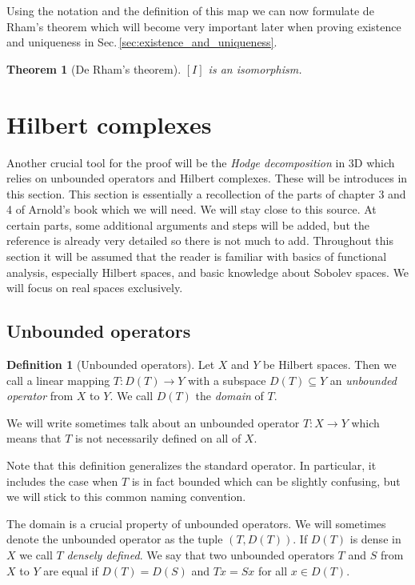 \documentclass[12pt,a4paper]{article}
\numberwithin{equation}{subsection}
\numberwithin{lemma}{subsection}
\newtheorem{theorem}[lemma]{Theorem}
\theoremstyle{definition}
\newtheorem{definition}[lemma]{Definition}
\begin{document}
Using the notation and the definition of this map we can now formulate 
de Rham's theorem which will become very important later when proving
existence and uniqueness in Sec.\,\ref{sec:existence_and_uniqueness}.
\begin{theorem}[De Rham's theorem]\label{thm:de_rhams_theorem}
    $[I]$ is an isomorphism.
\end{theorem}

\section{Hilbert complexes}

Another crucial tool for the proof will be the \textit{Hodge decomposition} 
in 3D which relies on unbounded operators and Hilbert complexes. These 
will be introduces in this section. This section is essentially a 
recollection of the parts of chapter 3 and 4 of Arnold's book \cite{arnold}
which we will need. We will stay close to this source. At certain parts, 
some additional arguments and steps will be added, but the reference is 
already very detailed so there is not much to add. Throughout this section 
it will be assumed that the reader is familiar with basics of functional analysis, 
especially Hilbert spaces, 
and basic knowledge about Sobolev spaces. We will focus on real spaces 
exclusively.

\subsection{Unbounded operators}\label{sec:unbounded_operators}

\begin{definition}[Unbounded operators]
    Let $X$ and $Y$ be Hilbert spaces. Then we call a linear mapping 
    $T: D(T) \rightarrow Y$ with a subspace $D(T) \subseteq Y$ an 
    \textit{unbounded 
    operator} from $X$ to $Y$. We call $D(T)$ the \textit{domain} of $T$.
\end{definition}
We will write sometimes talk about an unbounded operator $T:X \rightarrow Y$ 
which means that $T$ is not necessarily defined on all of $X$. 

Note that this definition generalizes the standard operator. In particular, 
it includes the case when $T$ is in fact bounded which can be 
slightly confusing, but we will stick to this common naming convention. 

The domain is a crucial property of unbounded operators. We will sometimes 
denote the unbounded operator as the tuple $(T,D(T))$.
If $D(T)$ is dense in $X$ we call $T$ \textit{densely defined}. 
We say that two unbounded operators $T$ and $S$ from $X$ to $Y$ are equal 
if $D(T) = D(S)$ and $Tx = Sx$ for all $x\in D(T)$.
\end{document}
